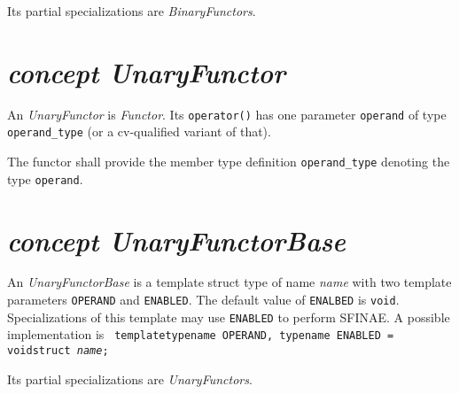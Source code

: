 \noindent{}Its partial specializations are \textit{BinaryFunctors}.
\section{\textit{concept UnaryFunctor}}
An \textit{UnaryFunctor} is \textit{Functor}.
Its \texttt{operator()} has one parameter \texttt{operand}  of type
\texttt{operand\_type} (or a cv-qualified variant of that).\newline

\noindent{}The functor shall provide the member type definition
\texttt{operand\_type} denoting the type      \texttt{operand}.

\section{\textit{concept UnaryFunctorBase}}
An \textit{UnaryFunctorBase} is a template struct type of     name \textit{name}
with two  template parameters \texttt{OPERAND} and \texttt{ENABLED}. The default
value of \texttt{ENALBED} is \texttt{void}. Specializations of this template may
use \texttt{ENABLED} to perform SFINAE.
A possible implementation is
\texttt{\newline
\noindent{}template\textlangle typename OPERAND,
typename ENABLED = void\textrangle\newline\noindent{}struct \textit{name};    }
\newline

\noindent{}Its partial specializations are \textit{UnaryFunctors}.
